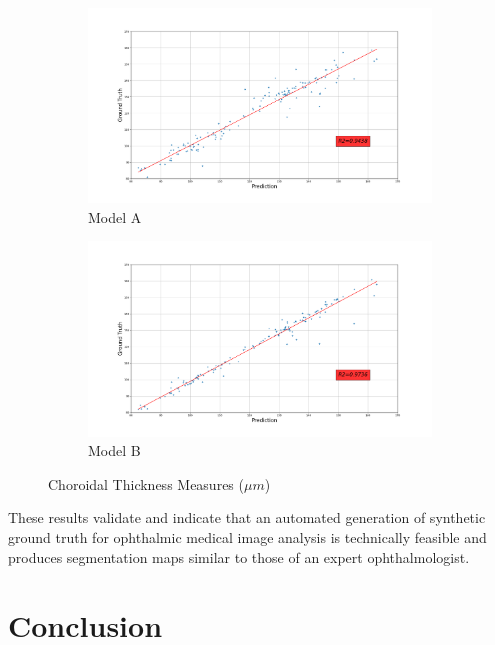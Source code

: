 \documentclass[12pt,a4paper]{scrartcl}
\begin{document}
\begin{figure}[H]
\centering
\begin{subfigure}{1\textwidth}
  \centering
  \includegraphics[width=\linewidth]{./results/model_A_choroidal_thickness.png}
  \caption{Model A}
  \label{fig:model_a_specificity}
\end{subfigure}
\begin{subfigure}{1\textwidth}
  \centering
  \includegraphics[width=\linewidth]{./results/model_B_choroidal_thickness.png}
  \caption{Model B}
  \label{fig:modelb_specificity}
\end{subfigure}
\caption{Choroidal Thickness Measures ($\mu m$)}
\label{fig:specificity_results}
\end{figure}

These results validate and indicate that an automated generation of synthetic ground truth for ophthalmic medical image analysis is technically feasible and produces segmentation maps similar to those of an expert ophthalmologist. 

\section{Conclusion}
\end{document}
